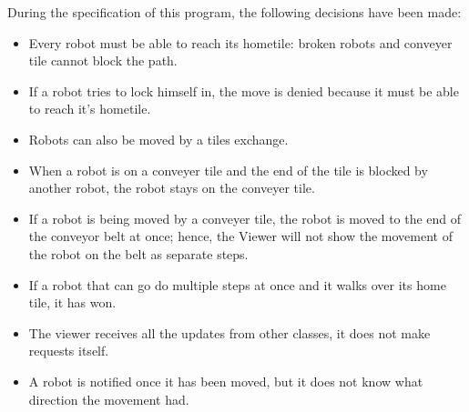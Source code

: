 During the specification of this program, the following decisions have been made:\\
\begin{itemize}
    \item Every robot must be able to reach its hometile: broken robots and conveyer tile cannot block the path.\\
    \item If a robot tries to lock himself in, the move is denied because it must be able to reach it's hometile.\\
    \item Robots can also be moved by a tiles exchange.\\
    \item When a robot is on a conveyer tile and the end of the tile is blocked by another robot, the robot stays on the conveyer tile.\\
    \item If a robot is being moved by a conveyer tile, the robot is moved to the end of the conveyor belt at once; hence, the Viewer will not show the movement of the robot on the belt as separate steps. \\
    \item If a robot that can go do multiple steps at once and it walks over its home tile, it has won.\\
    \item The viewer receives all the updates from other classes, it does not make requests itself.\\
    \item A robot is notified once it has been moved, but it does not know what direction the movement had.\\
\end{itemize} 